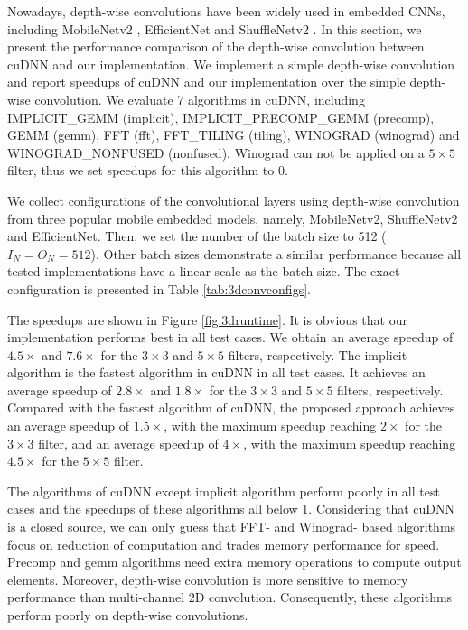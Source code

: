 Nowadays, depth-wise convolutions have been widely used in embedded CNNs, including MobileNetv2 \cite{Sandler_2018_CVPR}, EfficientNet \cite{tan2019efficientnet} and ShuffleNetv2 \cite{Ma_2018_ECCV}. In this section, we present the performance comparison of the depth-wise convolution between cuDNN and our implementation. We implement a simple depth-wise convolution and report speedups of cuDNN and our implementation over the simple depth-wise convolution. We evaluate 7 algorithms in cuDNN, including IMPLICIT\_GEMM (implicit), IMPLICIT\_PRECOMP\_GEMM (precomp), GEMM (gemm), FFT (fft), FFT\_TILING (tiling), WINOGRAD (winograd) and WINOGRAD\_NONFUSED (nonfused). Winograd can not be applied on a $5 \times 5$ filter, thus we set speedups for this algorithm to 0.

We collect configurations of the convolutional layers using depth-wise convolution from three popular mobile embedded models,
namely, MobileNetv2, ShuffleNetv2 and EfficientNet.
Then, we set the number of the batch size to 512 ($I_N=O_N=512$). Other batch sizes demonstrate a similar performance because all tested implementations have a linear scale as the batch size. The exact configuration is presented in Table \ref{tab:3dconvconfigs}.

The speedups are shown in Figure \ref{fig:3druntime}. It is obvious that our implementation performs best in all test cases. We obtain an average speedup of $4.5\times$ and $7.6\times$ for the $3 \times 3$ and $5 \times 5$ filters, respectively. The implicit algorithm is the fastest algorithm in cuDNN in all test cases. It achieves an average speedup of $2.8\times$ and $1.8\times$ for the $3 \times 3$ and $5 \times 5$ filters, respectively. Compared with the fastest algorithm of cuDNN, the proposed approach achieves an average speedup of $1.5\times$, with the maximum speedup reaching $2\times$ for the $3 \times 3$ filter, and an average speedup of $4\times$, with the maximum speedup reaching $4.5\times$ for the $5 \times 5$ filter.

The algorithms of cuDNN except implicit algorithm perform poorly in all test cases and the speedups of these algorithms all below 1. Considering that cuDNN is a closed source, we can only guess that FFT- and Winograd- based algorithms focus on reduction of computation and trades memory performance for speed. Precomp and gemm algorithms need extra memory operations to compute output elements. Moreover, depth-wise convolution is more sensitive to memory performance than multi-channel 2D convolution. Consequently, these algorithms perform poorly on depth-wise convolutions.

